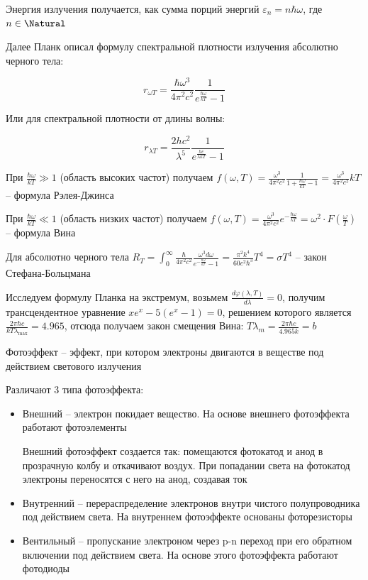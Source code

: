 Энергия излучения получается, как сумма порций энергий $\varepsilon_n = n \hbar \omega$, где $n \in \Natural$

Далее Планк описал формулу спектральной плотности излучения абсолютно черного тела:

\[r_{\omega T} = \frac{\hbar \omega^3}{4 \pi^2 c^2} \frac{1}{e^{\frac{\hbar \omega}{kT}} - 1}\]

Или для спектральной плотности от длины волны:

\[r_{\lambda T} = \frac{2 h c^2}{\lambda^5} \frac{1}{e^{\frac{hc}{\lambda kT}} - 1}\]

При $\frac{\hbar \omega}{kT} \gg 1$ (область высоких частот) получаем $f(\omega, T) = \frac{\omega^3}{4\pi^2 c^2} \frac{1}{1 + \frac{\hbar \omega}{kT} - 1} = \frac{\omega^3}{4\pi^2 c^2} kT$ -- формула Рэлея-Джинса

При $\frac{\hbar \omega}{kT} \ll 1$ (область низких частот) получаем $f(\omega, T) = \frac{\omega^3}{4\pi^2 c^2} e^{-\frac{\hbar \omega}{k T}} = \omega^2 \cdot F\left(\frac{\omega}{T}\right)$ -- формула Вина

Для абсолютно черного тела $R_T = \int_0^\infty \frac{\hbar}{4\pi^2 c^2} \frac{\omega^3 d\omega}{e^{-\frac{\hbar \omega}{k T}} - 1} = \frac{\pi^2 k^4}{60 c^2 \hbar^3} T^4 = \sigma T^4$ -- закон Стефана-Больцмана

\smallvspace 

Исследуем формулу Планка на экстремум, возьмем $\frac{d \varphi(\lambda, T)}{d\lambda} = 0$, получим трансцендентное уравнение $x e^x - 5(e^x - 1) = 0$, решением которого является $\frac{2\pi \hbar c}{k T \lambda_{\max}} = 4.965$, отсюда получаем закон смещения Вина: $T \lambda_m = \frac{2\pi \hbar c}{4.965 k} = b$

\bigvspace

Фотоэффект -- эффект, при котором электроны двигаются в веществе под действием светового излучения

Различают 3 типа фотоэффекта:

\begin{itemize}
    \item Внешний -- электрон покидает вещество. На основе внешнего фотоэффекта работают фотоэлементы
    
    Внешний фотоэффект создается так: помещаются фотокатод и анод в прозрачную колбу и откачивают воздух. При попадании света на фотокатод электроны переносятся с него на анод, создавая ток 

    \item Внутренний -- перераспределение электронов внутри чистого полупроводника под действием света. На внутреннем фотоэффекте основаны фоторезисторы

    \item Вентильный -- пропускание электроном через p-n переход при его обратном включении под действием света. На основе этого фотоэффекта работают фотодиоды
\end{itemize}


